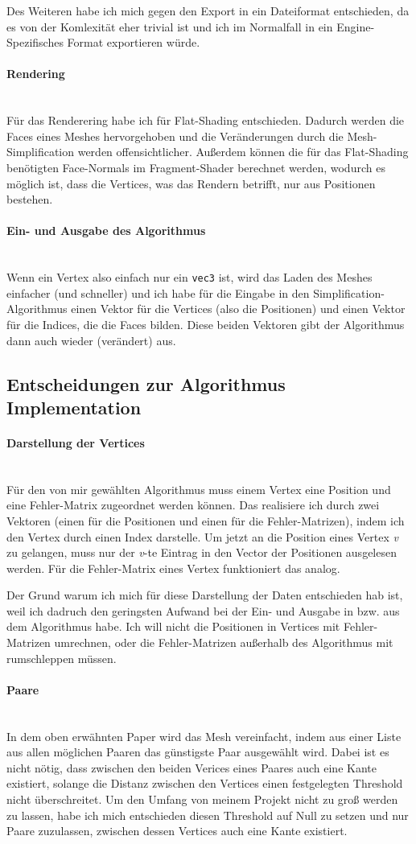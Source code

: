 \documentclass[a4paper,12pt]{book}
\newcommand{\myparagraph}[1]{\paragraph*{#1}\mbox{}\\}
\begin{document}
Des Weiteren habe ich mich gegen den Export in ein Dateiformat entschieden, da es von der Komlexität eher trivial ist und ich im Normalfall in ein Engine-Spezifisches Format exportieren würde.

\myparagraph{Rendering}
Für das Renderering habe ich für Flat-Shading entschieden. Dadurch werden die Faces eines Meshes hervorgehoben und die Veränderungen durch die Mesh-Simplification werden offensichtlicher.
Außerdem können die für das Flat-Shading benötigten Face-Normals im Fragment-Shader berechnet werden, wodurch es möglich ist, dass die Vertices, was das Rendern betrifft, nur aus Positionen bestehen. 

\myparagraph{Ein- und Ausgabe des Algorithmus}
Wenn ein Vertex also einfach nur ein \texttt{vec3} ist, wird das Laden des Meshes einfacher (und schneller) und ich habe für die Eingabe in den Simplification-Algorithmus einen Vektor für die Vertices (also die Positionen) und einen Vektor für die Indices, die die Faces bilden. Diese beiden Vektoren gibt der Algorithmus dann auch wieder (verändert) aus.

\subsection*{Entscheidungen zur Algorithmus Implementation}

\myparagraph{Darstellung der Vertices}
Für den von mir gewählten Algorithmus muss einem Vertex eine Position und eine Fehler-Matrix zugeordnet werden können.
Das realisiere ich durch zwei Vektoren (einen für die Positionen und einen für die Fehler-Matrizen), indem ich den Vertex durch einen Index darstelle.
Um jetzt an die Position eines Vertex \emph{v} zu gelangen, muss nur der \emph{v}-te Eintrag in den Vector der Positionen ausgelesen werden. Für die Fehler-Matrix eines Vertex funktioniert das analog.

Der Grund warum ich mich für diese Darstellung der Daten entschieden hab ist, weil ich dadruch den geringsten Aufwand bei der Ein- und Ausgabe in bzw. aus dem Algorithmus habe. 
Ich will nicht die Positionen in Vertices mit Fehler-Matrizen umrechnen, oder die Fehler-Matrizen außerhalb des Algorithmus mit rumschleppen müssen.

\myparagraph{Paare}
In dem oben erwähnten Paper wird das Mesh vereinfacht, indem aus einer Liste aus allen möglichen Paaren das günstigste Paar ausgewählt wird. Dabei ist es nicht nötig, dass zwischen den beiden Verices eines Paares auch eine Kante existiert, solange die Distanz zwischen den Vertices einen festgelegten Threshold nicht überschreitet. 
Um den Umfang von meinem Projekt nicht zu groß werden zu lassen, habe ich mich entschieden diesen Threshold auf Null zu setzen und nur Paare zuzulassen, zwischen dessen Vertices auch eine Kante existiert.
\end{document}
